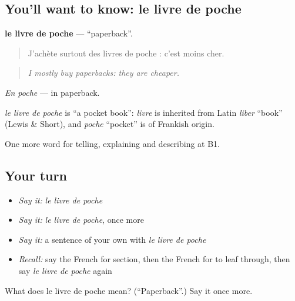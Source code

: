 \subsection*{You'll want to know: le livre de poche}
\textbf{le livre de poche} — \textquotedblleft{}paperback\textquotedblright{}.

\begin{quote}
J'achète surtout des livres de poche : c'est moins cher.
\end{quote}

\begin{quote}
\emph{I mostly buy paperbacks: they are cheaper.}
\end{quote}

\emph{En poche} — in paperback.

\begin{cousinweb}
\emph{le livre de poche} is \textquotedblleft{}a pocket book\textquotedblright{}: \emph{livre} is inherited from Latin \emph{liber} \textquotedblleft{}book\textquotedblright{} (Lewis \& Short), and \emph{poche} \textquotedblleft{}pocket\textquotedblright{} is of Frankish origin.
\end{cousinweb}

\begin{grammarlens}[title={What you've built}]
One more word for telling, explaining and describing at B1.
\end{grammarlens}

\subsection*{Your turn}
\begin{itemize}
\raggedright
  \item \emph{Say it:} \emph{le livre de poche}
  \item \emph{Say it:} \emph{le livre de poche}, once more
  \item \emph{Say it:} a sentence of your own with \emph{le livre de poche}
  \item \emph{Recall:} say the French for section, then the French for to leaf through, then say \emph{le livre de poche} again
\end{itemize}

\begin{tcolorbox}[breakable,colback=teal!4,colframe=teal!35!black,title={Before you move on}]
What does le livre de poche mean? (\textquotedblleft{}Paperback\textquotedblright{}.) Say it once more.
\end{tcolorbox}
